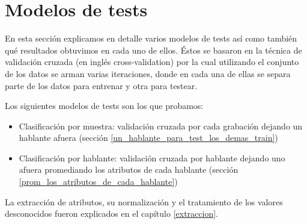 \section{Modelos de tests}
\label{modelos_tests}

En esta sección explicamos en detalle varios modelos de tests así como también qué resultados obtuvimos en cada uno de ellos. Éstos se basaron en la técnica de validación cruzada (en inglés cross-validation) por la cual utilizando el conjunto de los datos se arman varias iteraciones, donde en cada una de ellas se separa parte de los datos para entrenar y otra para testear. 

Los siguientes modelos de tests son los que probamos:
\begin{itemize}
	\item Clasificación por muestra: validación cruzada por cada grabación dejando un hablante afuera (sección \ref{un_hablante_para_test_los_demas_train})
	\item Clasificación por hablante: validación cruzada por hablante dejando uno afuera promediando los atributos de cada hablante (sección \ref{prom_los_atributos_de_cada_hablante})
\end{itemize}

La extracción de atributos, su normalización y el tratamiento de los valores desconocidos fueron explicados en el capítulo \ref{extraccion}.

%



%


%